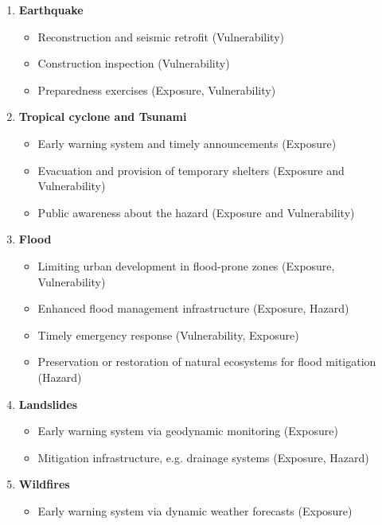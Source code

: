 \documentclass[utf8]{frontiersSCNS} %
\begin{document}
\begin{enumerate}

    \item \textbf{Earthquake}
    \begin{itemize}
            \item Reconstruction and seismic retrofit (Vulnerability)
            \item Construction inspection (Vulnerability)
            \item Preparedness exercises (Exposure, Vulnerability)
    \end{itemize}
    
    \item \textbf{Tropical cyclone and Tsunami}
    \begin{itemize}
            \item Early warning system and timely announcements (Exposure)
            \item Evacuation and provision of temporary shelters (Exposure and Vulnerability)
            \item Public awareness about the hazard (Exposure and Vulnerability)
    \end{itemize}
    
    \item \textbf{Flood}
    \begin{itemize}
            \item Limiting urban development in flood-prone zones (Exposure, Vulnerability)
            \item Enhanced flood management infrastructure (Exposure, Hazard)
            \item Timely emergency response (Vulnerability, Exposure)
            \item Preservation or restoration of natural ecosystems for flood mitigation (Hazard)
    \end{itemize}

    \item \textbf{Landslides}
    \begin{itemize}
            \item Early warning system via geodynamic monitoring (Exposure)
            \item Mitigation infrastructure, e.g. drainage systems (Exposure, Hazard)
    \end{itemize}

    \item \textbf{Wildfires}
    \begin{itemize}
            \item Early warning system via dynamic weather forecasts (Exposure)
    \end{itemize}

\end{enumerate}
\end{document}
